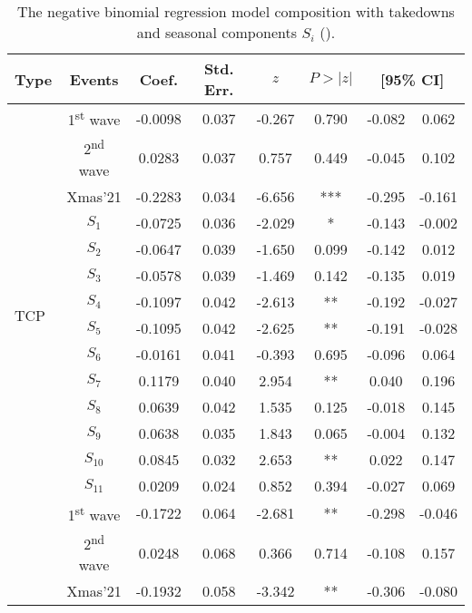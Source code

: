 \documentclass[letterpaper,twocolumn,10pt]{article}
\begin{document}
\begin{table}[ht!]
\centering
\vspace{-4mm}
\caption{The negative binomial regression model composition with takedowns and seasonal components $S_i$ (\netscout).}
\setlength{\tabcolsep}{0.225em}
\vspace{2mm}
\small
\begin{tabular}{lccccccc}
    \toprule
    Type & Events & Coef. & Std. Err. & $z$ & $P>|z|$ & \multicolumn{2}{c}{[95\% CI]}\\
    \midrule
    \multirow{15}{*}{TCP} & 1\textsuperscript{st} wave &  -0.0098 &   0.037 &  -0.267 &   0.790 &   -0.082 &    0.062 \\
    & 2\textsuperscript{nd} wave & 0.0283 &   0.037 &   0.757 &   0.449 &   -0.045 &    0.102\\
    & Xmas'21 & -0.2283 &   0.034 &  -6.656 &   *** &   -0.295 &   -0.161\\
    & $S_{1}$ & -0.0725 &   0.036 &  -2.029 &   * &   -0.143 &   -0.002\\
    & $S_{2}$ & -0.0647 &   0.039 &  -1.650 &   0.099 &   -0.142 &    0.012\\
    & $S_{3}$ &  -0.0578 &   0.039 &  -1.469 &   0.142 &   -0.135 &    0.019\\
    & $S_{4}$ & -0.1097 &   0.042 &  -2.613 &   ** &   -0.192 &   -0.027\\
    & $S_{5}$ &  -0.1095 &   0.042 &  -2.625 &   ** &   -0.191 &   -0.028\\
    & $S_{6}$ &  -0.0161 &   0.041 &  -0.393 &   0.695 &   -0.096 &    0.064\\
    & $S_{7}$ &  0.1179 &   0.040 &   2.954 &   ** &    0.040 &    0.196\\
    & $S_{8}$ &  0.0639 &   0.042 &   1.535 &   0.125 &   -0.018 &    0.145\\
    & $S_{9}$ &  0.0638 &   0.035 &   1.843 &   0.065 &   -0.004 &    0.132\\
    & $S_{10}$ &  0.0845 &   0.032 &   2.653 &   ** &    0.022 &    0.147\\
    & $S_{11}$ &  0.0209 &   0.024 &   0.852 &   0.394 &   -0.027 &    0.069\\
    \midrule
    \multirow{15}{*}{UDP} & 1\textsuperscript{st} wave & -0.1722 &   0.064 &  -2.681 &   ** &   -0.298 &   -0.046\\
    & 2\textsuperscript{nd} wave & 0.0248 &   0.068 &   0.366 &   0.714 &   -0.108 &    0.157\\
    & Xmas'21 & -0.1932 &   0.058 &  -3.342 &   ** &   -0.306 &   -0.080\\

\end{tabular}
\end{table}
\end{document}
